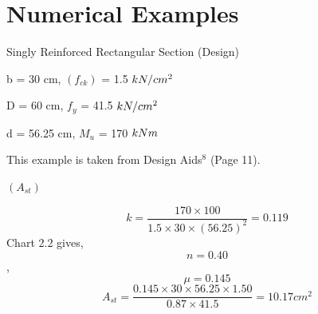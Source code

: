 \section{Numerical Examples}
\begin{example}
 Singly Reinforced Rectangular Section (Design)

\given 
b = 30 cm, $(f_{ck})$ = 1.5 $kN/cm^2$

 D = 60 cm, $f_y$ = 41.5 $kN/cm^2$

d = 56.25 cm, $M_u$  = 170 $kNm$

This example is taken from Design Aids$^{8}$ (Page 11).

\required$(A_{st})$

\solution
$$k= \frac{170 \times 100}{1.5 \times 30 \times (56.25)^2} =0.119$$
Chart 2.2 gives,
$$n=0.40$$, 
$$\mu=0.145$$
$$A_{st}=\frac{0.145 \times 30 \times 56.25 \times 1.50}{0.87 \times 41.5} = 10.17 cm^2$$
\end{example}


